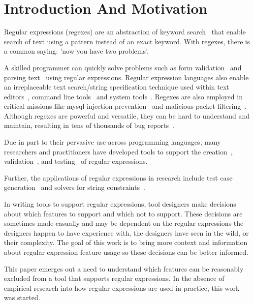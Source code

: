 \section{Introduction And Motivation}

Regular expressions (regexes) are an abstraction of keyword search~\cite{} that enable search of text using a pattern instead of an exact keyword.  With regexes, there is a common saying: 'now you have two problems'.

A skilled programmer can quickly solve problems such as form validation~\cite{} and parsing text~\cite{} using regular expressions.  Regular expression languages also enable an irreplaceable text search/string specification technique used within text editors~\cite{}, command line tools~\cite{} and system tools~\cite{}.  Regexes are also employed in critical missions like mysql injection prevention~\cite{} and malicious packet filtering~\cite{}.  Although regexes are powerful and versatile, they can be hard to understand and maintain, resulting in tens of thousands of bug reports~\cite{Spishak:2012:TSR:2318202.2318207}.

Due in part to their pervasive use across programming languages, many researchers and practitioners have developed tools to support the creation~\cite{}, validation~\cite{}, and testing~\cite{} of regular expressions.

Further, the applications of regular expressions in research include test case generation~\cite{Ghosh:2013:JAT:2486788.2486925, Galler:2014:STD:2683035.2683100} and solvers for string constraints~\cite{Trinh:2014:SSS:2660267.2660372, hampi}.

In writing tools to support regular expressions, tool designers make decisions about which features to support and which not to support. These decisions are sometimes made casually and may be dependent on the regular expressions the designers happen to have experience with, the designers have seen in the wild, or their complexity. The goal of this work is to bring more context and information about regular expression feature usage so these decisions can be better informed.

This paper emerges out a need to understand which features can be reasonably excluded from a tool that supports regular expressions. In the absence of empirical research into how regular expressions are used in practice, this work was started.

